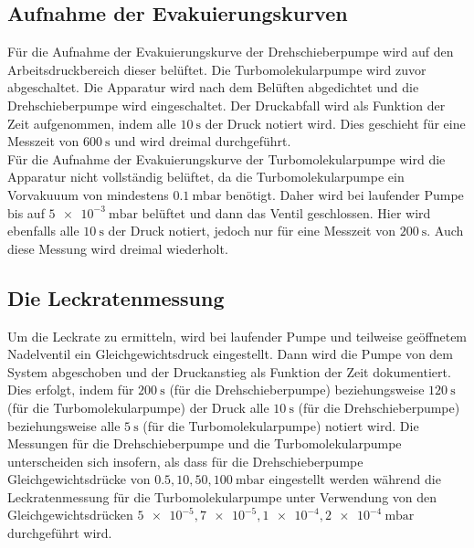 \subsection{Aufnahme der Evakuierungskurven}
\label{subsec:evakkurven}
Für die Aufnahme der Evakuierungskurve der Drehschieberpumpe wird auf den Arbeitsdruckbereich
dieser belüftet. Die Turbomolekularpumpe wird zuvor abgeschaltet. Die Apparatur wird nach
dem Belüften abgedichtet und die Drehschieberpumpe wird eingeschaltet. Der Druckabfall
wird als Funktion der Zeit aufgenommen, indem alle $\SI{10}{\second}$ der Druck notiert wird.
Dies geschieht für eine Messzeit von $\SI{600}{\second}$ und wird dreimal durchgeführt.\\
Für die Aufnahme der Evakuierungskurve der Turbomolekularpumpe wird die Apparatur nicht vollständig
belüftet, da die Turbomolekularpumpe ein Vorvakuuum von mindestens $\SI{0.1}{\milli\bar}$ benötigt.
Daher wird bei laufender Pumpe bis auf
$\SI{5e-3}{\milli\bar}$ belüftet und dann das Ventil geschlossen. Hier wird ebenfalls alle
$\SI{10}{\second}$ der Druck notiert, jedoch nur für eine Messzeit von $\SI{200}{\second}$.
Auch diese Messung wird dreimal wiederholt.

\subsection{Die Leckratenmessung}
\label{subsec:leckratenm}
Um die Leckrate zu ermitteln, wird bei laufender Pumpe und teilweise geöffnetem Nadelventil
ein Gleichgewichtsdruck eingestellt. Dann wird die Pumpe von dem System abgeschoben und der
Druckanstieg als Funktion der Zeit dokumentiert. Dies erfolgt, indem für $\SI{200}{\second}$
(für die Drehschieberpumpe) beziehungsweise $\SI{120}{\second}$ (für die Turbomolekularpumpe)
der Druck alle $\SI{10}{\second}$ (für die Drehschieberpumpe) beziehungsweise alle $\SI{5}{\second}$
(für die Turbomolekularpumpe) notiert wird. Die Messungen für die Drehschieberpumpe und die
Turbomolekularpumpe unterscheiden sich insofern, als dass für die Drehschieberpumpe Gleichgewichtsdrücke
von $\num{0.5}, \num{10}, \num{50}, \SI{100}{\milli\bar}$ eingestellt werden während die
Leckratenmessung für die Turbomolekularpumpe unter Verwendung von den Gleichgewichtsdrücken
$\num{5e-5}, \num{7e-5}, \num{1e-4}, \SI{2e-4}{\milli\bar}$ durchgeführt wird.
